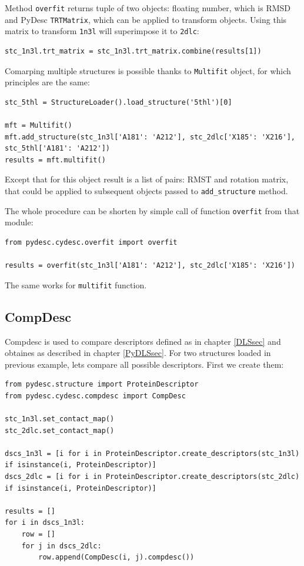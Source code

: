 \documentclass{article}
\begin{document}
Method \texttt{overfit} returns tuple of two objects: floating number, which is RMSD and PyDesc \texttt{TRTMatrix}, which can be applied to transform objects. Using this matrix to transform \texttt{1n3l} will superimpose it to \texttt{2dlc}:

\begin{lstlisting}
stc_1n3l.trt_matrix = stc_1n3l.trt_matrix.combine(results[1])
\end{lstlisting}

Comarping multiple structures is possible thanks to \texttt{Multifit} object, for which principles are the same:

\begin{lstlisting}
stc_5thl = StructureLoader().load_structure('5thl')[0]

mft = Multifit()
mft.add_structure(stc_1n3l['A181': 'A212'], stc_2dlc['X185': 'X216'], stc_5thl['A181': 'A212'])
results = mft.multifit()
\end{lstlisting}

Except that for this object result is a list of pairs: RMST and rotation matrix, that could be applied to subsequent objects passed to \texttt{add\_{}structure} method.

The whole procedure can be shorten by simple call of function \texttt{overfit} from that module:

\begin{lstlisting}
from pydesc.cydesc.overfit import overfit

results = overfit(stc_1n3l['A181': 'A212'], stc_2dlc['X185': 'X216'])
\end{lstlisting}

The same works for \texttt{multifit} function.

%
%
\subsection{CompDesc}

Compdesc is used to compare descriptors defined as in chapter \ref{DLSsec} and obtaines as described in chapter \ref{PyDLSsec}. For two structures loaded in previous example, lets compare all possible descriptors. First we create them:

\begin{lstlisting}
from pydesc.structure import ProteinDescriptor
from pydesc.cydesc.compdesc import CompDesc

stc_1n3l.set_contact_map()
stc_2dlc.set_contact_map()

dscs_1n3l = [i for i in ProteinDescriptor.create_descriptors(stc_1n3l) if isinstance(i, ProteinDescriptor)]
dscs_2dlc = [i for i in ProteinDescriptor.create_descriptors(stc_2dlc) if isinstance(i, ProteinDescriptor)]

results = []
for i in dscs_1n3l:
    row = []
    for j in dscs_2dlc:
        row.append(CompDesc(i, j).compdesc())
\end{lstlisting}
\end{document}
